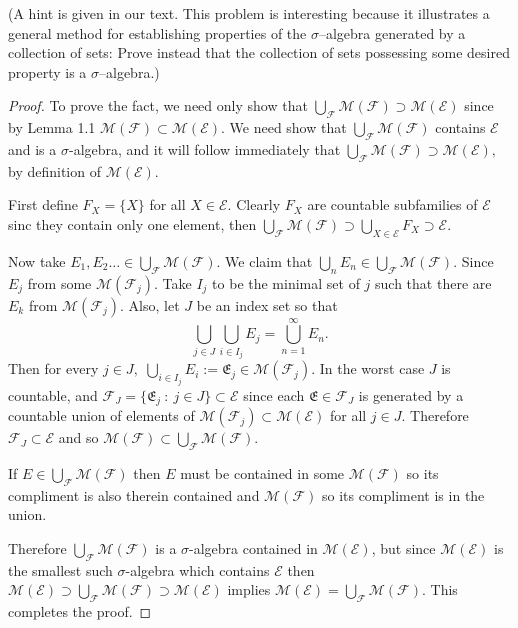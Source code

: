 \documentclass[11pt]{amsart}
\def\scriptf{{\mathcal F}}
\def\scriptm{{\mathcal M}}
\def\scripte{{\mathcal E}}
\begin{document}
(A hint is given in our text. This problem is interesting because it illustrates
a general method for establishing properties of the $\sigma$--algebra generated
by a collection of sets: Prove instead
that the collection of sets possessing some desired property is a $\sigma$--algebra.)
\begin{proof}
	To prove the fact, we need only show that $\bigcup_\scriptf \scriptm(\scriptf) \supset \scriptm(\scripte)$ since by Lemma 1.1 $\scriptm(\scriptf) \subset \scriptm(\scripte).$ We need show that $\bigcup_\scriptf \scriptm(\scriptf)$ contains $\scripte$ and is a $\sigma$-algebra, and it will follow immediately that $\bigcup_\scriptf \scriptm(\scriptf) \supset \scriptm(\scripte),$ by definition of $\scriptm(\scripte).$

	First define $F_X = \{X\}$ for all $X \in \scripte.$ Clearly $F_X$ are countable subfamilies of $\scripte$ sinc they contain only one element, then $\bigcup_\scriptf \scriptm(\scriptf) \supset \bigcup_{X \in \scripte} F_X \supset \scripte$. 

	Now take $E_1, E_2 \dots  \in \bigcup_\scriptf \scriptm(\scriptf).$ We claim that $\bigcup_n E_n \in \bigcup_\scriptf \scriptm(\scriptf).$ Since $E_j$ from some $\scriptm(\scriptf_j)$. Take $I_j$ to be the minimal set of $j$ such that there are $E_k$ from $  \scriptm(\scriptf_j).$ Also, let $J$ be an index set so that 
	\begin{equation*}
		\bigcup_{j \in J} \bigcup_{i \in I_j} E_j = \bigcup_{n=1}^\infty E_n.
	\end{equation*}
	Then for every $j \in J,$  $\bigcup_{i \in I_j}E_i := \mathfrak{E}_j \in \scriptm(\scriptf_j)$. In the worst case $J$ is countable, and $\scriptf_J = \{\mathfrak{E}_j\ :\ j \in J\} \subset \scripte $ since each $\mathfrak{E} \in \scriptf_J$ is generated by a countable union of elements of $\scriptm(\scriptf_j) \subset \scriptm(\scripte)$ for all $j \in J$. Therefore $\scriptf_J \subset \scripte$ and so $\scriptm(\scriptf) \subset \bigcup_\scriptf \scriptm(\scriptf).$ 

	 If $E \in \bigcup_\scriptf \scriptm(\scriptf)$ then $E$ must be contained in some $\scriptm(\scriptf)$ so its compliment is also therein contained and $\scriptm(\scriptf)$ so its compliment is in the union. 

	 Therefore $\bigcup_\scriptf \scriptm(\scriptf)$ is a $\sigma$-algebra contained in $\scriptm(\scripte)$, but since $\scriptm(\scripte)$ is the smallest such $\sigma$-algebra which contains $\scripte$ then $\scriptm(\scripte) \supset \bigcup_\scriptf \scriptm(\scriptf) \supset \scriptm(\scripte)$ implies $\scriptm(\scripte) = \bigcup_\scriptf \scriptm(\scriptf).$ This completes the proof.
 \end{proof}
\end{document}
